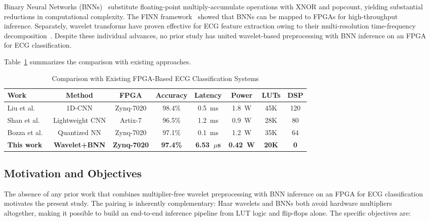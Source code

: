 \documentclass[conference]{IEEEtran}
\begin{document}
Binary Neural Networks (BNNs)~\cite{courbariaux2016binarized, rastegari2016xnor} substitute floating-point multiply-accumulate operations with XNOR and popcount, yielding substantial reductions in computational complexity. The FINN framework~\cite{umuroglu2017finn} showed that BNNs can be mapped to FPGAs for high-throughput inference. Separately, wavelet transforms have proven effective for ECG feature extraction owing to their multi-resolution time-frequency decomposition~\cite{mallat1989wavelet, li2017wavelet}. Despite these individual advances, no prior study has united wavelet-based preprocessing with BNN inference on an FPGA for ECG classification.

Table~\ref{tab:comparison} summarizes the comparison with existing approaches.

\begin{table}[!t]
    \centering
    \caption{Comparison with Existing FPGA-Based ECG Classification Systems}
    \label{tab:comparison}
    \begin{tabular}{lccccccc}
        \toprule
        \textbf{Work} & \textbf{Method} & \textbf{FPGA} & \textbf{Accuracy} & \textbf{Latency} & \textbf{Power} & \textbf{LUTs} & \textbf{DSP} \\
        \midrule
        Liu et al.~\cite{liu2020fpga} & 1D-CNN & Zynq-7020 & 98.4\% & 0.5~ms & 1.8~W & 45K & 120 \\
        Shan et al.~\cite{shan2022real} & Lightweight CNN & Artix-7 & 96.5\% & 1.2~ms & 0.9~W & 28K & 80 \\
        Bozza et al.~\cite{bozza2023ecg} & Quantized NN & Zynq-7020 & 97.1\% & 0.1~ms & 1.2~W & 35K & 64 \\
        \textbf{This work} & \textbf{Wavelet+BNN} & \textbf{Zynq-7020} & \textbf{97.4\%} & \textbf{6.53~$\mu$s} & \textbf{0.42~W} & \textbf{20K} & \textbf{0} \\
        \bottomrule
    \end{tabular}
\end{table}

\subsection{Motivation and Objectives}

The absence of any prior work that combines multiplier-free wavelet preprocessing with BNN inference on an FPGA for ECG classification motivates the present study. The pairing is inherently complementary: Haar wavelets and BNNs both avoid hardware multipliers altogether, making it possible to build an end-to-end inference pipeline from LUT logic and flip-flops alone. The specific objectives are:
\end{document}
